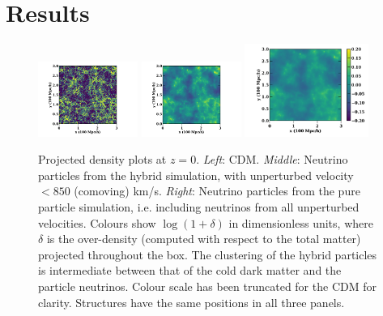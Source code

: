 \documentclass[useAMS, usenatbib]{mnras}
\begin{document}

\section{Results}
\label{sec:results}

\begin{figure}
\includegraphics[trim={1.5cm 0 3.3cm 0},clip,width=0.29\textwidth]{nuplots/dens-plt-b300p512nu0_4hyb850t1.pdf}
\includegraphics[trim={1.5cm 0 3.3cm 0},clip, width=0.29\textwidth]{nuplots/dens-plt-b300p512nu0_4hyb850t2.pdf}
\includegraphics[trim={1.5cm 0 0.5cm 0},clip, width=0.36\textwidth]{nuplots/dens-plt-b300p512nu0_4p1024t2.pdf}
    \caption{Projected density plots at $z=0$. \emph{Left}: CDM. \emph{Middle}: Neutrino particles from the hybrid simulation, with unperturbed velocity $<850$ (comoving) km/s. \emph{Right}: Neutrino particles from the pure particle simulation, i.e. including neutrinos from all unperturbed velocities. Colours show $\log (1+ \delta)$ in dimensionless units, where $\delta$ is the over-density (computed with respect to the total matter) projected throughout the box.
  The clustering of the hybrid particles is intermediate between that of the cold dark matter and the particle neutrinos. Colour scale has been truncated for the CDM for clarity. Structures have the same positions in all three panels.
  }
  \label{fig:density_plot}
\end{figure}
\end{document}
